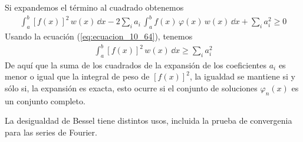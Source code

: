 Si expandemos el término al cuadrado obtenemos
\begin{align}
\int_{a}^{b} [ f(x) ]^{2} \, w(x) \, \dd{x} - 2 \sum_{i} a_{i} \, \int_{a}^{b} f(x) \, \varphi (x) \, w(x) \, \dd{x} + \sum_{i} a_{i}^{2} \geq 0
\label{eq:ecuacion_10_72}
\end{align}
Usando la ecuación (\ref{eq:ecuacion_10_64}), tenemos
\begin{align}
\int_{a}^{b} [f(x)]^{2} \, w(x) \, \dd{x} \geq \sum_{i} a_{i}^{2}
\label{eq:ecuacion_10_73}
\end{align}
De aquí que la suma de los cuadrados de la expansión de los coeficientes $a_{i}$ es menor o igual que la integral de peso de $[f(x)]^{2}$, la igualdad se mantiene si y sólo si, la expansión es exacta, esto ocurre si el conjunto de soluciones $\varphi_{n}(x)$ es un conjunto completo.
\par
La desigualdad de Bessel tiene distintos usos, incluida la prueba de convergenia para las series de Fourier.

